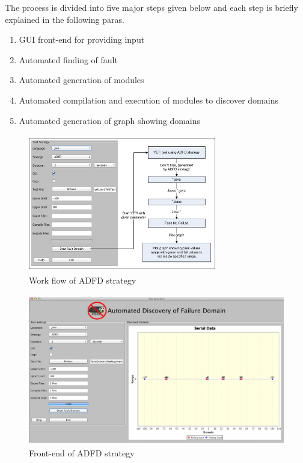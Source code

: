 \documentclass[runningheads,a4paper]{llncs}
\begin{document}
The process is divided into five major steps given below and each step is briefly explained in the following paras.

\begin{enumerate}
\item GUI front-end for providing input
\item Automated finding of fault
\item Automated generation of modules
\item Automated compilation and execution of modules to discover domains
\item Automated generation of graph showing domains
\end{enumerate}

\begin{figure}[ht]
\centering
\includegraphics[width=8.2cm,height=6cm]{ADFD-Diagram1.png}
\caption{Work flow of ADFD strategy}
\label{fig:ADFD}
\end{figure}

\begin{figure}[htp]
\begin{center}
\includegraphics[width=12cm,height=6.6cm]{ADFD-front-end.png}
\caption{Front-end of ADFD strategy}
\label{fig:ADFD}
\end{center}
\end{figure}
\end{document}
